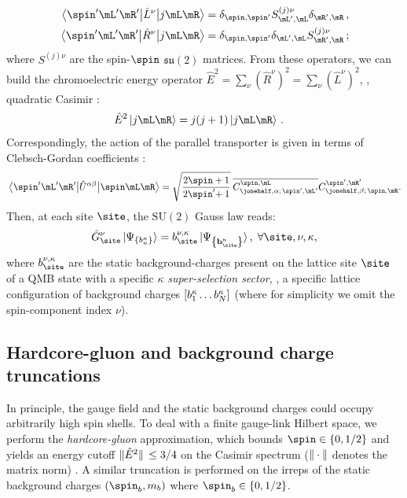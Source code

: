 \documentclass[aps,prl,reprint,twocolumn,superscriptaddress,floatfix,nofootinbib]{revtex4-2}
\begin{document}
\begin{align}
    \label{eq_LR_rishon_rotations}
    \mel{\spin^{\prime} \mL^{\prime} \mR^{\prime}}{\hat{L}^{\nu}}{ j \mL \mR } & =\delta_{\spin,\spin^{\prime}}S^{(j)\nu}_{\mL^{\prime},\mL} \delta_{\mR^{\prime},\mR}\,, \\
    \mel{\spin^{\prime} \mL^{\prime} \mR^{\prime} }{\hat{R}^{\nu}}{j \mL \mR } & =\delta_{\spin,\spin^{\prime}}\delta_{\mL^{\prime},\mL} S^{(j)\nu}_{\mR^{\prime},\mR}\,;
\end{align}
where $S^{(j)\nu}$ are the spin-$\spin$ $\mathfrak{su}(2)$ matrices.
From these operators, we can build the chromoelectric energy operator
\begin{math}
    \hat{E}^2 =\sum_{\nu}(\hat{R}^{\nu})^2 =\sum_{\nu}(\hat{L}^{\nu})^2
\end{math},
\idest{}, quadratic Casimir \cite{Zohar2015QuantumSimulationsLattice}:
\begin{align}
    \hat{E}^2\ket{j \mL \mR } & =j(j+1)\ket{j \mL \mR }\,.
\end{align}
Correspondingly, the action of the parallel transporter is given in terms of Clebsch-Gordan coefficients \cite{Zohar2015FormulationLatticeGauge}:
\begin{equation}
    \label{eq_parallel_transporter}
    \mel{\spin^{\prime}\mL^{\prime}\mR^{\prime}}{\hat{U}^{\alpha\beta}}{\spin\mL \mR}
    =\sqrt{\frac{2\spin+1}{2\spin ^{\mathrlap{\prime}}+1}}\:
    \overline{C^{\spin,\mL}_{\jonehalf,\alpha;\,\spin^{\prime},\mL^{\prime}}}
    C^{\spin^{\prime},\mR^{\prime}}_{\jonehalf,\beta;\,\spin,\mR}.
\end{equation}
Then, at each site $\site$, the $\mathrm{SU}(2)$ Gauss law reads:
\begin{equation}
    \hat{G}_{\site}^{\nu}
    \ket{\Psi_{\qty{b^{\kappa}_{n}}}} =
    b_{\site}^{\nu,\kappa}
    \ket{\Psi_{\qty{\vb{b}^{\kappa}_{\site}}}}, \; \forall \site, \nu,\kappa,
\end{equation}
where $b_{\site}^{\nu,\kappa}$ are the static background-charges present on the lattice site $\site$ of a QMB state with a specific $\kappa$ \emph{super-selection sector}, \idest{}, a specific lattice configuration of background charges $\qty[b^{\kappa}_{1}\dots b^{\kappa}_{N}]$ (where for simplicity we omit the spin-component index $\nu$).

\subsection{Hardcore-gluon and background charge truncations}
In principle, the gauge field and the static background charges could occupy arbitrarily high spin shells.
To deal with a finite gauge-link Hilbert space, we perform the \emph{hardcore-gluon} approximation, which bounds $\spin\in\{0,1/2\}$ and yields an energy cutoff $\norm*{\hat{E}^2} \leq 3/4$ on the Casimir spectrum ($\norm{\:\cdot\:}$ denotes the matrix norm) \cite{Cataldi2024Simulating2+1DSU2, Calajo2024DigitalQuantumSimulation, Calajo2025QuantumManybodyScarring}.
A similar truncation is performed on the irreps of the static background charges $(\spin_{b},m_{b})$ where $\spin_{b}\in\{0,1/2\}$.
\end{document}
